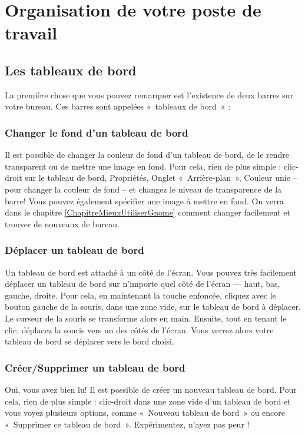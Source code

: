 \section{Organisation de votre poste de travail}
\subsection{Les tableaux de bord}
La première chose que vous pouvez remarquer est l'existence de deux barres sur votre bureau. Ces barres sont appelées «~tableaux de bord~» :
\subsubsection{Changer le fond d'un tableau de bord}
Il est possible de changer la couleur de fond d'un tableau de bord, de le rendre transparent ou de mettre une image en fond. Pour cela, rien de plus simple : clic-droit sur le tableau de bord, Propriétés, Onglet «~Arrière-plan~», Couleur unie -- pour changer la couleur de fond -- et changez le niveau de transparence de la barre! Vous pouvez également spécifier une image à mettre en fond. On verra dans le chapitre \ref{ChapitreMieuxUtiliserGnome} comment changer facilement et trouver de nouveaux  de bureau.
\subsubsection{Déplacer un tableau de bord}
Un tableau de bord est attaché à un côté de l'écran. Vous pouvez très facilement déplacer un tableau de bord sur n'importe quel côté de l'écran --- haut, bas, gauche, droite. Pour cela, en maintenant la touche  enfoncée, cliquez avec le bouton gauche de la souris, dans une zone vide, sur le tableau de bord à déplacer. Le curseur de la souris se transforme alors en main. Ensuite, tout en tenant le clic, déplacez la souris vers un des côtés de l'écran. Vous verrez alors votre tableau de bord se déplacer vers le bord choisi.
\subsubsection{Créer/Supprimer un tableau de bord}
Oui, vous avez bien lu! Il est possible de créer un nouveau tableau de bord. Pour cela, rien de plus simple : clic-droit dans une zone vide d'un tableau de bord et vous voyez plusieurs options, comme «~Nouveau tableau de bord~» ou encore «~Supprimer ce tableau de bord~». Expérimentez, n'ayez pas peur !
